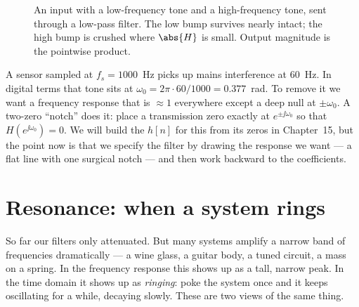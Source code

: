 \begin{figure}[H]
\centering
{}
\caption{An input with a low-frequency tone and a high-frequency tone, sent
through a low-pass filter. The low bump survives nearly intact; the high bump is
crushed where $\abs{H}$ is small. Output magnitude is the pointwise product.}
\label{ch14:fig-reshape}
\end{figure}

\begin{example}
\label{ch14:ex-notch}
A sensor sampled at $f_s = 1000$~Hz picks up mains interference at $60$~Hz. In
digital terms that tone sits at $\omega_0 = 2\pi\cdot 60/1000 = 0.377$~rad. To
remove it we want a frequency response that is $\approx 1$ everywhere except a
deep null at $\pm\omega_0$. A two-zero ``notch'' does it: place a transmission
zero exactly at $e^{\pm\jj\omega_0}$ so that $H(e^{\jj\omega_0})=0$. We will
build the $h[n]$ for this from its zeros in Chapter~15, but the point now is
that we specify the filter by drawing the response we want --- a flat line with
one surgical notch --- and then work backward to the coefficients.
\end{example}

\section{Resonance: when a system rings}
\label{ch14:resonance}

So far our filters only attenuated. But many systems amplify a narrow band of
frequencies dramatically --- a wine glass, a guitar body, a tuned circuit, a
mass on a spring. In the frequency response this shows up as a tall, narrow peak.
In the time domain it shows up as \emph{ringing}: poke the system once and it
keeps oscillating for a while, decaying slowly. These are two views of the same
thing.

